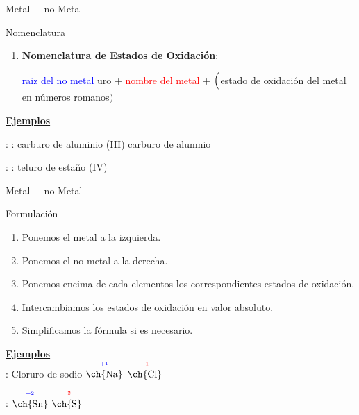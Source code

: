 \documentclass{beamer}
\newcommand{\eob}[2]{$\overset{^{\color{blue}#1}}{\text{\ch{#2}}}$}
\newcommand{\eor}[2]{$\overset{^{\color{red}#1}}{\text{\ch{#2}}}$}
\newcommand{\nline}[1][6pt]{\\[#1]}
\begin{document}
\begin{frame}[t]{Metal + no Metal}
    \begin{alertblock}{\Large Nomenclatura}\vspace*{5pt}

        \begin{enumerate}[label=\itembolascolor{\arabic*}{mDarkTeal}]
            \addtocounter{enumi}{1}
            \item \textbf{\uline{Nomenclatura de Estados de Oxidación}}:
                  \begin{center}
                      \textcolor{blue}{raiz del no metal} \textcolor{mygreen}{uro}  + \textcolor{red}{nombre del metal} + $\Bigl($\textcolor{green!50!black}{estado de oxidación del metal en números romanos}$\Bigr)$
                  \end{center}

        \end{enumerate}
        \textbf{\uline{Ejemplos}}

         : : carburo de aluminio (III) \ch{->} carburo de alumnio

         : : teluro  de estaño (IV)
    \end{alertblock}
\end{frame}


\begin{frame}[t]{Metal + no Metal}
    \begin{exampleblock}{\Large Formulación}
        \begin{enumerate}[label=\itembolascolor{\arabic*}{mDarkTeal}]
            \item Ponemos el metal a la izquierda.
            \item Ponemos el no metal a la derecha.
            \item Ponemos encima de cada elementos los correspondientes estados de oxidación.
            \item Intercambiamos los estados de oxidación en valor absoluto.
            \item Simplificamos la fórmula si es necesario.
        \end{enumerate}
    \end{exampleblock}
    \textbf{\uline{Ejemplos}}\nline{}
     : Cloruro de sodio \ch{->} \eob{+1}{Na} \eor{-1}{Cl} \ch{->} 

     : \ch{->} \eob{+2}{Sn} \eor{-2}{S}  \ch{->}  \ch{->} 
\end{frame}
\end{document}
